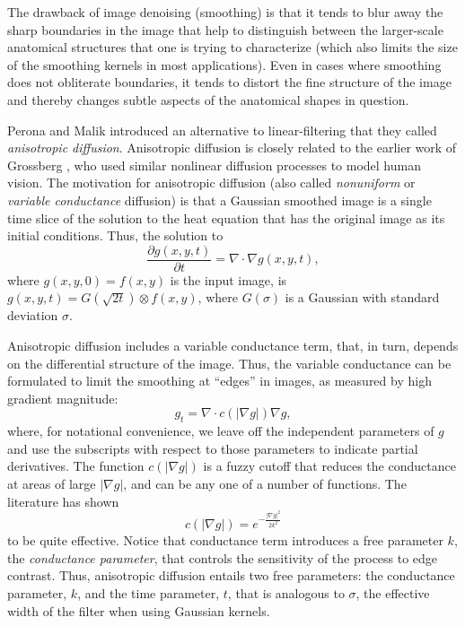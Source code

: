 %
%
%
%

The drawback of image denoising (smoothing) is that it tends to blur away the
sharp boundaries in the image that help to distinguish between the
larger-scale anatomical structures that one is trying to characterize (which
also limits the size of the smoothing kernels in most applications).  Even in
cases where smoothing does not obliterate boundaries, it tends to distort the
fine structure of the image and thereby changes subtle aspects of the
anatomical shapes in question.

Perona and Malik \cite{Perona1990} introduced an alternative to
linear-filtering that they called \emph{anisotropic diffusion}.  Anisotropic
diffusion is closely related to the earlier work of Grossberg
\cite{Grossberg1984}, who used similar nonlinear diffusion processes to model
human vision.  The motivation for anisotropic diffusion (also called
\emph{nonuniform} or \emph{variable conductance} diffusion) is that a Gaussian
smoothed image is a single time slice of the solution to the heat equation
that has the original image as its initial conditions.  Thus, the solution to
\begin{equation} \frac{\partial g(x, y, t) }{\partial t} = \nabla \cdot \nabla
g(x, y, t), \end{equation} where $g(x, y, 0) = f(x, y)$ is the input image, is
$g(x, y, t) = G(\sqrt{2t}) \otimes f(x, y)$, where $G(\sigma)$ is a Gaussian
with standard deviation $\sigma$.  

Anisotropic diffusion includes a variable conductance term, that, in turn,
depends on the differential structure of the image.  Thus, the variable
conductance can be formulated to limit the smoothing at ``edges'' in images, as
measured by high gradient magnitude: \begin{equation} g_{t} = \nabla \cdot
c(\left| \nabla g \right|) \nabla g, \label{eq:aniso} \end{equation} where, for
notational convenience, we leave off the independent parameters of $g$ and use
the subscripts with respect to those parameters to indicate partial
derivatives.  The function $c(|\nabla g|)$ is a fuzzy cutoff that reduces the
conductance at areas of large $|\nabla g|$, and can be any one of a number of
functions.  The literature has shown \begin{equation} c(|\nabla g|) =
e^{-\frac{|\nabla g|^{2}}{2k^{2}}} \end{equation} to be quite effective.
Notice that conductance term introduces a free parameter $k$, the {\em
conductance parameter}, that controls the sensitivity of the process to edge
contrast.  Thus, anisotropic diffusion entails two free parameters: the
conductance parameter, $k$, and the time parameter, $t$, that is analogous to
$\sigma$, the effective width of the filter when using Gaussian kernels.

